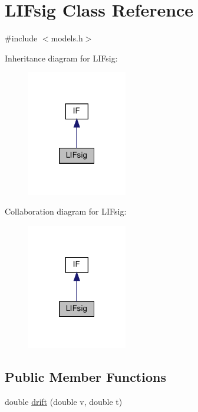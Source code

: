 \hypertarget{classLIFsig}{}\section{L\+I\+Fsig Class Reference}
\label{classLIFsig}


{\ttfamily \#include $<$models.\+h$>$}



Inheritance diagram for L\+I\+Fsig\+:\nopagebreak
\begin{figure}[H]
\begin{center}
\leavevmode
\includegraphics[width=124pt]{classLIFsig__inherit__graph}
\end{center}
\end{figure}


Collaboration diagram for L\+I\+Fsig\+:\nopagebreak
\begin{figure}[H]
\begin{center}
\leavevmode
\includegraphics[width=124pt]{classLIFsig__coll__graph}
\end{center}
\end{figure}
\subsection*{Public Member Functions}
\begin{DoxyCompactItemize}
\item 
double \hyperlink{classLIFsig_a169dcb5d3704157102bbc725445cf0a5}{drift} (double v, double t)
\end{DoxyCompactItemize}
